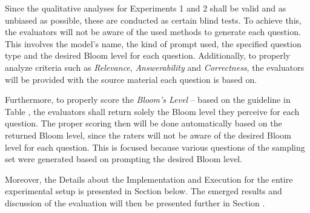 \pagebreak

Since the qualitative analyses for Experiments 1 and 2 shall be valid and as unbiased as possible, these are conducted as certain blind tests. To achieve this, the evaluators will not be aware of the used methods to generate each question. This involves the model's name, the kind of prompt used, the specified question type and the desired Bloom level for each question. Additionally, to properly analyze criteria such as \textit{Relevance}, \textit{Answerability} and \textit{Correctness}, the evaluators will be provided with the source material each question is based on. 

Furthermore, to properly score the \textit{Bloom's Level} -- based on the guideline in Table , the evaluators shall return solely the Bloom level they perceive for each question. The proper scoring then will be done automatically based on the returned Bloom level, since the raters will not be aware of the desired Bloom level for each question. This is focused because various questions of the sampling set were generated based on prompting the desired Bloom level.

Moreover, the Details about the Implementation and Execution for the entire experimental setup is presented in Section  below. The emerged results and discussion of the evaluation will then be presented further in Section .

